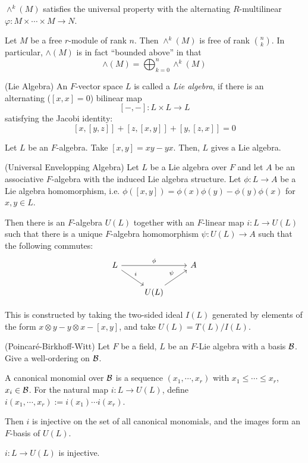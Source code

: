 \documentclass{article}
\begin{document}
\begin{theorem}
  \(\wedge^k(M)\) satisfies the universal property
  with the alternating \(R\)-multilinear \(\varphi: M \times \cdots \times M \to N\).
\end{theorem}

\begin{example}
  Let \(M\) be a free \(r\)-module of rank \(n\).
  Then \(\wedge^k(M)\) is free of rank \({n \choose k}\).
  In particular, \(\wedge(M)\) is in fact ``bounded above'' in that
  \[\wedge(M) = \bigoplus_{k=0}^n \wedge^k(M)\]
\end{example}

\begin{definition}(Lie Algebra)
  An \(F\)-vector space \(L\) is called a \emph{Lie algebra},
  if there is an alternating (\([x, x] = 0\)) bilinear map
  \[[-, -]: L \times L \to L\]
  satisfying the Jacobi identity:
  \[[x, [y, z]] + [z, [x, y]] + [y, [z, x]] = 0\]
\end{definition}
\begin{example}
  Let \(L\) be an \(F\)-algebra. Take \([x, y] = xy - yx\).
  Then, \(L\) gives a Lie algebra.
\end{example}

\begin{theorem}(Universal Envelopping Algebra)
Let \(L\) be a Lie algebra over \(F\)
and let \(A\) be an associative \(F\)-algebra
with the induced Lie algebra structure.
Let \(\phi: L \to A\) be a Lie algebra homomorphism,
i.e. \(\phi([x, y]) = \phi(x)\phi(y) - \phi(y)\phi(x)\)
for \(x, y \in L\).

Then there is an \(F\)-algebra \(U(L)\) together with
an \(F\)-linear map \(i: L \to U(L)\)
such that there is a unique \(F\)-algebra homomorphism
\(\psi: U(L) \to A\) such that the following commutes:
\[\begin{tikzcd}
  L \ar["i"]{rd} \ar["\phi"]{rr} & & A \\
  & U(L) \ar["\psi"]{ru} &
\end{tikzcd}\]

This is constructed by taking the two-sided ideal \(I(L)\) generated by
elements of the form \(x \otimes y - y \otimes x - [x, y]\),
and take \(U(L) = T(L) / I(L)\).
\end{theorem}

\begin{theorem}(Poincar\'e-Birkhoff-Witt)
  Let \(F\) be a field, \(L\) be an \(F\)-Lie algebra with a basis \(\mathcal{B}\).
  Give a well-ordering on \(\mathcal{B}\).

  A canonical monomial over \(\mathcal{B}\) is a sequence \((x_1, \cdots, x_r)\)
  with \(x_1 \le \cdots \le x_r\), \(x_i \in \mathcal{B}\).
  For the natural map \(i: L \to U(L)\),
  define \(i(x_1, \cdots, x_r) := i(x_1) \cdots i(x_r)\).

  Then \(i\) is injective on the set of all canonical monomials,
  and the images form an \(F\)-basis of \(U(L)\).
\end{theorem}
\begin{corollary}
  \(i: L \to U(L)\) is injective.
\end{corollary}
\end{document}
